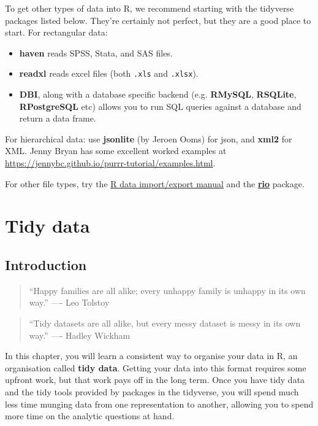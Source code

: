 \documentclass[]{book}
\begin{document}
To get other types of data into R, we recommend starting with the
tidyverse packages listed below. They're certainly not perfect, but they
are a good place to start. For rectangular data:

\begin{itemize}
\item
  \textbf{haven} reads SPSS, Stata, and SAS files.
\item
  \textbf{readxl} reads excel files (both \texttt{.xls} and
  \texttt{.xlsx}).
\item
  \textbf{DBI}, along with a database specific backend (e.g.
  \textbf{RMySQL}, \textbf{RSQLite}, \textbf{RPostgreSQL} etc) allows
  you to run SQL queries against a database and return a data frame.
\end{itemize}

For hierarchical data: use \textbf{jsonlite} (by Jeroen Ooms) for json,
and \textbf{xml2} for XML. Jenny Bryan has some excellent worked
examples at
\url{https://jennybc.github.io/purrr-tutorial/examples.html}.

For other file types, try the
\href{https://cran.r-project.org/doc/manuals/r-release/R-data.html}{R
data import/export manual} and the
\href{https://github.com/leeper/rio}{\textbf{rio}} package.

\chapter{Tidy data}\label{tidy-data}

\section{Introduction}\label{introduction-6}

\begin{quote}
``Happy families are all alike; every unhappy family is unhappy in its
own way.'' ---- Leo Tolstoy
\end{quote}

\begin{quote}
``Tidy datasets are all alike, but every messy dataset is messy in its
own way.'' ---- Hadley Wickham
\end{quote}

In this chapter, you will learn a consistent way to organise your data
in R, an organisation called \textbf{tidy data}. Getting your data into
this format requires some upfront work, but that work pays off in the
long term. Once you have tidy data and the tidy tools provided by
packages in the tidyverse, you will spend much less time munging data
from one representation to another, allowing you to spend more time on
the analytic questions at hand.
\end{document}
